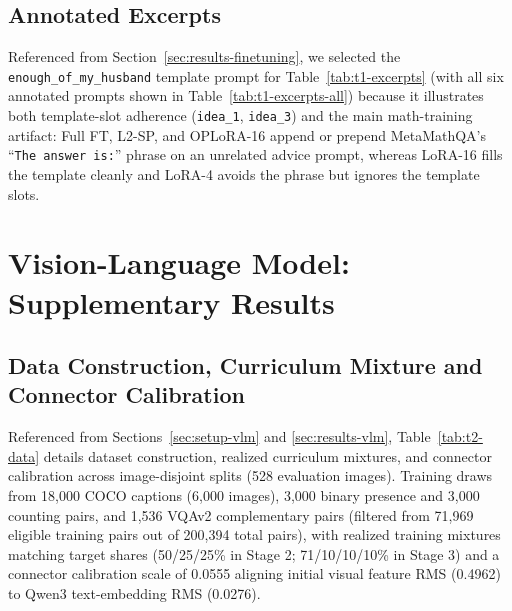 \documentclass{article}
\begin{document}
\subsection{Annotated Excerpts}
\label{app:ft-excerpts}
Referenced from Section~\ref{sec:results-finetuning}, we selected the \texttt{enough\_of\_my\_husband} template prompt for Table~\ref{tab:t1-excerpts} (with all six annotated prompts shown in Table~\ref{tab:t1-excerpts-all}) because it illustrates both template-slot adherence (\texttt{idea\_1}, \texttt{idea\_3}) and the main math-training artifact: Full FT, L2-SP, and OPLoRA-16 append or prepend MetaMathQA's ``\texttt{The answer is:}'' phrase on an unrelated advice prompt, whereas LoRA-16 fills the template cleanly and LoRA-4 avoids the phrase but ignores the template slots.



\section{Vision-Language Model: Supplementary Results}
\label{app:vlm}

\subsection{Data Construction, Curriculum Mixture and Connector Calibration}
\label{app:vlm-data}
Referenced from Sections~\ref{sec:setup-vlm} and \ref{sec:results-vlm}, Table~\ref{tab:t2-data} details dataset construction, realized curriculum mixtures, and connector calibration across image-disjoint splits (528 evaluation images). Training draws from 18,000 COCO captions (6,000 images), 3,000 binary presence and 3,000 counting pairs, and 1,536 VQAv2 complementary pairs (filtered from 71,969 eligible training pairs out of 200,394 total pairs), with realized training mixtures matching target shares (50/25/25\% in Stage 2; 71/10/10/10\% in Stage 3) and a connector calibration scale of 0.0555 aligning initial visual feature RMS (0.4962) to Qwen3 text-embedding RMS (0.0276).

\end{document}
